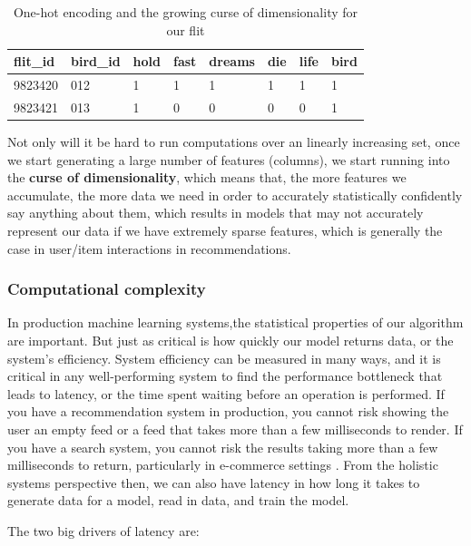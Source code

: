 \documentclass[11pt, table]{diazessay} %
\begin{document}
\begin{sloppypar}
  \begin{table}[H]
	\centering
    	\caption{One-hot encoding and the growing curse of dimensionality for our flit}
\begin{tabular}{|l|l|l|l|l|l|l|l|}
\hline
\rowcolor[HTML]{D5E7F7}  
flit\_id & bird\_id & hold & fast & dreams & die & life & bird \\ \hline
9823420  & 012  & 1   & 1	& 1  	& 1  & 1    	& 1   \\ \hline
9823421  & 013  & 1   & 0	& 0  	& 0  & 0    	& 1   \\ \hline
\end{tabular}

\end{table}

Not only will it be hard to run computations over an linearly increasing set, once we start generating a large number of features (columns), we start running into the \textbf{curse of dimensionality}, which means that, the more features we accumulate, the more data we need in order to accurately statistically confidently say anything about them, which results in models that may not accurately represent our data\citep{houle2010can} if we have extremely sparse features, which is generally the case in user/item interactions in recommendations.   

\subsubsection{Computational complexity}
 
In production machine learning systems,the statistical properties of our algorithm are important. But just as critical is how quickly our model returns data, or the system's efficiency. System efficiency can be measured in many ways, and it is critical in any well-performing system to find the performance bottleneck that leads to latency, or the time spent waiting before an operation is  performed\citep{gregg2014systems}. If you have a recommendation system in production, you cannot risk showing the user an empty feed or a feed that takes more than a few milliseconds to render. If you have a search system, you cannot risk the results taking more than a few milliseconds to return, particularly in e-commerce settings \cite{arapakis2014impact}.  From the holistic systems perspective then, we can also have latency in how long it takes to generate data for a model, read in data, and train the model.

The two big drivers of latency are:


\end{sloppypar}
\end{document}
